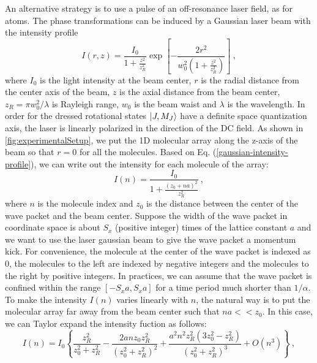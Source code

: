An alternative strategy is to use a pulse of an
off-resonance laser field, as for atoms. The phase transformations can be induced
by a Gaussian laser beam with the intensity profile
\begin{equation}
I(r, z) = \frac{I_0}{1+
\frac{z^2}{z_R^2}}\exp\left[-\frac{2r^2}{w_0^2\left (1+
\frac{z^2}{z_R^2}\right) }\right] \ ,
\label{gaussian-intensity-profile}
\end{equation}
where $I_0$ is the light intensity at the beam center, $r$ is the
radial distance from the center axis of the beam, $z$ is the axial
distance from the beam center,  $z_R=\pi w_0^2/\lambda$ is
Rayleigh range, $w_0$ is the beam waist and $\lambda$ is the wavelength.
In order for the dressed rotational states $| J, M_J \rangle$ have a definite space quantization axis, the laser is linearly polarized in the direction of the DC field. 
As shown in \autoref{fig:experimentalSetup}, we put the 1D molecular array  along the z-axis of
the beam so that $r=0$ for all the molecules. 
Based on Eq.
(\ref{gaussian-intensity-profile}), we can write out the
intensity for each molecule of the array:
\begin{equation}
I(n) = \frac{I_0}{1+ \frac{(z_0 + na)^2}{z_R^2}} \  ,
\label{gaussian-intensity-profile2}
\end{equation}
where $n$ is the molecule index and $z_0$ is the distance between
the center of the wave packet and the beam center.
Suppose the width of
the wave packet in coordinate space is about $S_x$ (positive
integer) times of the lattice constant $a$ and we want to use the
laser gaussian beam to give the wave packet a momentum kick. For
convenience,  the molecule at the center of the wave packet is
indexed as 0, the molecules to the left are indexed by negative
integers and  the molecules to the right by positive integers.  In
practices, we can assume that the wave packet is confined within
the range $[-S_x a, S_x a]$ for a time period much shorter than
$1/\alpha$.  
To make the intensity $I(n)$ varies linearly with $n$, the natural way is to put the molecular array far away from the beam center such that $na << z_0$.
In this case, we can Taylor expand the intensity fuction as follows:
\begin{equation}
I(n) =I_0\left\{ \frac{z_R^2}{z_0^2+z_R^2}-\frac{2 a n z_0 z_R^2}{\left(z_0^2+ z_R^2\right)^2}+\frac{a^2 n^2 z_R^2 \left(3 z_0^2-z_R^2\right)}{\left(z_0^2+z_R^2\right)^3}  + O(n^3)\right\} \ , \label{taylor-expansion}
\end{equation}
